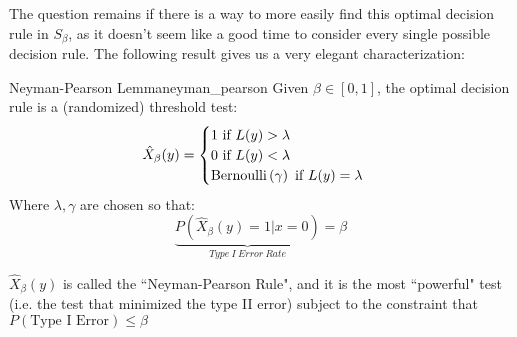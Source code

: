 The question remains if there is a way to more easily find this optimal decision rule in \(S_\beta\), as it doesn't seem like a good time to consider every single possible decision rule. The following result gives us a very elegant characterization:
\begin{thm}{Neyman-Pearson Lemma}{neyman_pearson}
Given \(\beta \in [0,1]\), the optimal decision rule is a (randomized) threshold test:
\begin{equation*}
  \hat{X}_\beta (y) =
  \begin{cases}
  	1 \textrm{ if \(L(y) > \lambda\)} \\
  	0 \textrm{ if \(L(y) < \lambda\)} \\
  	\text{Bernoulli}\left( \gamma \right) \textrm{ if \(L(y) = \lambda\)}
  	
  \end{cases}
\end{equation*}
Where \(\lambda, \gamma\) are chosen so that:
\begin{equation*}
  \underbrace{P(\hat{X}_\beta (y) = 1 | x = 0)}_{Type\ I\ Error\ Rate} = \beta
\end{equation*}

\(\hat{X}_\beta (y)\) is  called the ``Neyman-Pearson Rule", and it is the most ``powerful" test (i.e. the test that minimized the type II error) subject to the constraint that \(P(\textrm{Type I Error}) \leq \beta\)


\end{thm}



 






